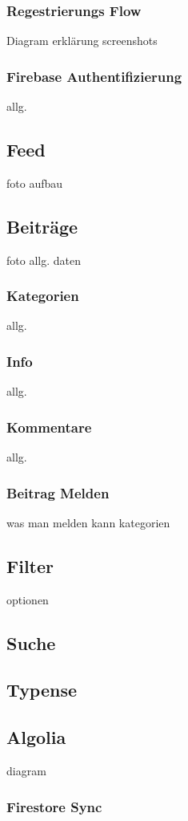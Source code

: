 \subsubsection{Regestrierungs Flow}
Diagram
erklärung
screenshots


\subsubsection{Firebase Authentifizierung}
allg.


\subsection{Feed}
foto
aufbau
\subsection{Beiträge}
foto
allg.
daten
\subsubsection{Kategorien}
allg.


\subsubsection{Info}
allg.
\subsubsection{Kommentare}
allg.
\subsubsection{Beitrag Melden}
was  man melden kann
kategorien


\subsection{Filter}
optionen
\subsection{Suche}
\subsection{Typense}
\subsection{Algolia}
diagram
\subsubsection{Firestore Sync}

